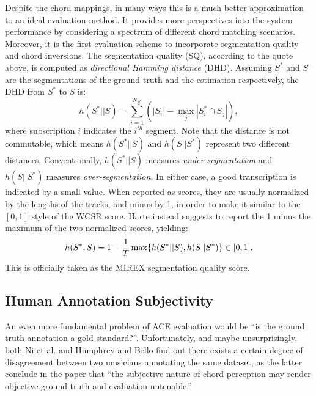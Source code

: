 Despite the chord mappings, in many ways this is a much better approximation to an ideal evaluation method. It provides more perspectives into the system performance by considering a spectrum of different chord matching scenarios. Moreover, it is the first evaluation scheme to incorporate segmentation quality and chord inversions. The segmentation quality (SQ), according to the quote above, is computed as {\it directional Hamming distance} (DHD). Assuming $S^*$ and $S$ are the segmentations of the ground truth and the estimation respectively, the DHD from $S^*$ to $S$ is:
\begin{equation}
h(S^*||S) = \sum_{i=1}^{N_{S^*}}(|S_i|-\max_j|S_i^* \cap S_j|),
\end{equation}
where subscription $i$ indicates the $i^{th}$ segment. Note that the distance is not commutable, which means $h(S^*||S)$ and $h(S||S^*)$ represent two different distances. Conventionally, $h(S^*||S)$ measures {\it under-segmentation} and $h(S||S^*)$ measures {\it over-segmentation}. In either case, a good transcription is indicated by a small value. When reported as scores, they are usually normalized by the lengths of the tracks, and minus by 1, in order to make it similar to the $[0,1]$ style of the WCSR score. Harte instead suggests to report the 1 minus the maximum of the two normalized scores, yielding:
\begin{equation}
h(S^*,S)=1-{1\over T}\max\{h(S^*||S), h(S||S^*)\} \in [0,1].
\end{equation}
This is officially taken as the MIREX segmentation quality score.

\subsection{Human Annotation Subjectivity} \label{sec:2-subjectivity}
An even more fundamental problem of ACE evaluation would be ``is the ground truth annotation a gold standard?''. Unfortunately, and maybe unsurprisingly, both Ni et al. \cite{ni2013understanding} and Humphrey and Bello \cite{humphreyfour} find out there exists a certain degree of disagreement between two musicians annotating the same dataset, as the latter conclude in the paper that ``the subjective nature of chord perception may render objective ground truth and evaluation untenable.''

